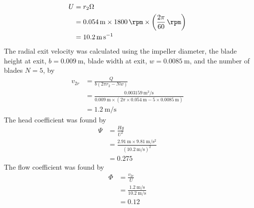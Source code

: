 \begin{align*}
    U &= r_2 \Omega \\
    &= \qty{0.054}{\meter} \times \qty{1800}{\rpm} \times \left(\frac{2\pi}{60}\,\unit{\per\rpm}\right) \\
    &= \qty{10.2}{\meter\per\second}
\end{align*}
The radial exit velocity was calculated using the impeller diameter, the blade height at exit, $b = \qty{0.009}{\meter}$, blade width at exit, $w = \qty{0.0085}{\meter}$, and the number of blades $N=5$, by
\begin{align*}
    v_{2r} &= \frac{Q}{b(2\pi r_2 - Nw)} \\
    &= \frac{\qty{0.003159}{\meter\cubed\per\second}}{\qty{0.009}{\meter} \times (2\pi \times \qty{0.054}{\meter} - 5 \times \qty{0.0085}{\meter})} \\
    &= \qty{1.2}{\meter\per\second}
\end{align*}
The head coefficient was found by
\begin{align*}
    \Psi &= \frac{Hg}{U^2} \\
    &= \frac{\qty{2.91}{\meter} \times \qty{9.81}{\meter\per\second\squared}}{(\qty{10.2}{\meter\per\second})^2} \\
    &= 0.275
\end{align*}
The flow coefficient was found by
\begin{align*}
    \Phi &= \frac{v_{2r}}{U} \\
    &= \frac{\qty{1.2}{\meter\per\second}}{\qty{10.2}{\meter\per\second}} \\
    &= 0.12
\end{align*}
